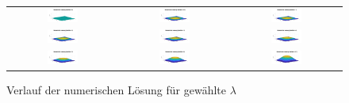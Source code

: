 \documentclass[11pt,a4paper]{article}
\begin{document}
 \begin{figure}
\begin{tabular}{ccc}
  \includegraphics[width=0.3\textwidth]{bild2-0} &  
  \includegraphics[width=0.3\textwidth]{bild2-0.5.png} &
  \includegraphics[width=0.3\textwidth]{bild2-1} \\
  \includegraphics[width=0.3\textwidth]{bild2-2} &  
  \includegraphics[width=0.3\textwidth]{bild2-3} &
  \includegraphics[width=0.3\textwidth]{bild2-4} \\
  \includegraphics[width=0.3\textwidth]{bild2-5} &  
  \includegraphics[width=0.3\textwidth]{bild2-6} &
  \includegraphics[width=0.3\textwidth]{bild2-6.7.png} \\
  
  \end{tabular}
\caption{Verlauf der numerischen L\"osung f\"ur gew\"ahlte $\lambda$}
  \end{figure}
  
\end{document}
